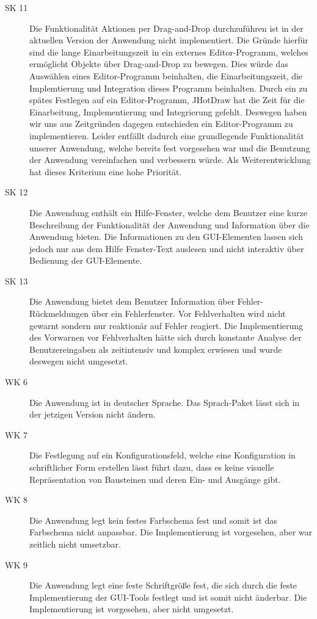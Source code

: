 \documentclass[parskip=full]{scrartcl}
\begin{document}
\begin{description}
\item[SK 11] Die Funktionalität Aktionen per Drag-and-Drop durchzuführen ist in der aktuellen Version der Anwendung nicht implementiert. Die Gründe hierfür sind die lange Einarbeitungszeit in ein externes Editor-Programm, welches ermöglicht Objekte über Drag-and-Drop zu bewegen. Dies würde das Auswählen eines Editor-Programm beinhalten, die Einarbeitungszeit, die Implemtierung und Integration dieses Programm beinhalten. Durch ein zu spätes Festlegen auf ein Editor-Programm, \gls{JHotDraw} hat die Zeit für die Einarbeitung, Implementierung und Integrierung gefehlt. Deswegen haben wir uns aus Zeitgründen dagegen entschieden ein Editor-Programm zu implementieren. Leider entfällt dadurch eine grundlegende Funktionalität unserer Anwendung, welche bereits fest vorgesehen war und die Benutzung der Anwendung vereinfachen und verbessern würde. Als Weiterentwicklung hat dieses Kriterium eine hohe Priorität.
\item[SK 12] Die Anwendung enthält ein Hilfe-Fenster, welche dem Benutzer eine kurze Beschreibung der Funktionalität der Anwendung und Information über die Anwendung bieten. Die Informationen zu den GUI-Elementen lassen sich jedoch nur aus dem Hilfe Fenster-Text auslesen und nicht interaktiv über Bedienung der GUI-Elemente.
\item[SK 13] Die Anwendung bietet dem Benutzer Information über Fehler-Rückmeldungen über ein Fehlerfenster. 
Vor Fehlverhalten wird nicht gewarnt sondern nur reaktionär auf Fehler reagiert. Die Implementierung des Vorwarnen vor Fehlverhalten hätte sich durch konstante Analyse der Benutzereingaben als zeitintensiv und komplex erwiesen und wurde deswegen nicht umgesetzt.
\item[WK 6] Die Anwendung ist in deutscher Sprache. Das Sprach-Paket lässt sich in der jetzigen Version nicht ändern.
\item[WK 7] Die Festlegung auf ein Konfigurationsfeld, welche eine Konfiguration in schriftlicher Form erstellen lässt führt dazu, dass es keine visuelle Repräsentation von Bausteinen und deren Ein- und Ausgänge gibt.
\item[WK 8] Die Anwendung legt kein festes Farbschema fest und somit ist das Farbschema nicht anpassbar. Die Implementierung ist vorgesehen, aber war zeitlich nicht umsetzbar.
\item[WK 9] Die Anwendung legt eine feste Schriftgröße fest, die sich durch die feste Implementierung der GUI-Tools festlegt und ist somit nicht änderbar. Die Implementierung ist vorgesehen, aber nicht umgesetzt.
\end{description}
\end{document}
